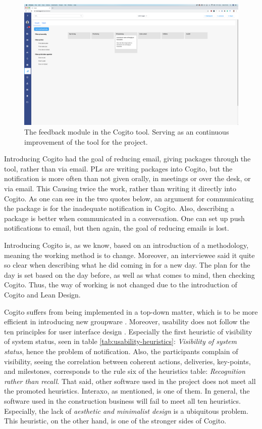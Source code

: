 \begin{figure}
    \centering
    \includegraphics[width=\textwidth]{fig/cogitos_feedback.png}
    \caption{The feedback module in the Cogito tool. Serving as an continuous improvement of the tool for the project.}
    \label{fig:cogito_feedback}
\end{figure}

Introducing Cogito had the goal of reducing email, giving packages through the tool, rather than via email. PLs are writing packages into Cogito, but the notification is more often than not given orally, in meetings or over the desk, or via email. This Causing twice the work, rather than writing it directly into Cogito. As one can see in the two quotes below, an argument for communicating the package is for the inadequate notification in Cogito. Also, describing a package is better when communicated in a conversation. One can set up push notifications to email, but then again, the goal of reducing emails is lost. 

Introducing Cogito is, as we know, based on an introduction of a methodology, meaning the working method is to change. Moreover, an interviewee said it quite so clear when describing what he did coming in for a new day. The plan for the day is set based on the day before, as well as what comes to mind, then checking Cogito. Thus, the way of working is not changed due to the introduction of Cogito and Lean Design.

Cogito suffers from being implemented in a top-down matter, which is to be more efficient in introducing new groupware \cite{Robey&Sahay}. Moreover, usability does not follow the ten principles for user interface design \cite{nielsen199510}. Especially the first heuristic of visibility of system status, seen in table \ref{tab:usability-heuristics}: \textit{Visibility of system status}, hence the problem of notification. Also, the participants complain of visibility, seeing the correlation between coherent actions, deliveries, key-points, and milestones, corresponds to the rule six of the heuristics table: \textit{Recognition rather than recall}. That said, other software used in the project does not meet all the promoted heuristics. Interaxo, as mentioned, is one of them. In general, the software used in the construction business will fail to meet all ten heuristics. Especially, the lack of \textit{aesthetic and minimalist design} is a ubiquitous problem. This heuristic, on the other hand, is one of the stronger sides of Cogito.

